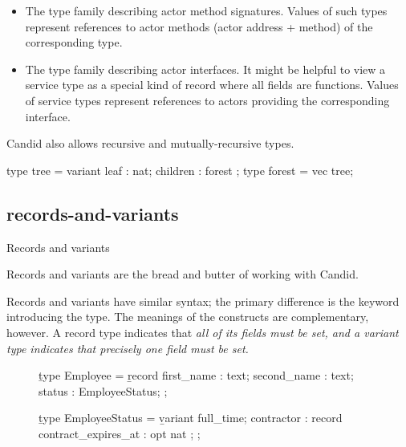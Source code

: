 \documentclass{article}
\begin{document}
\begin{itemize}
    \item
    The \href{https://internetcomputer.org/docs/current/references/candid-ref#type-func---}{} type family describing actor method signatures.
    Values of such types represent references to actor methods (actor address + method) of the corresponding type.
    \item
    The \href{https://internetcomputer.org/docs/current/references/candid-ref#type-service-}{} type family describing actor interfaces.
    It might be helpful to view a service type as a special kind of record where all fields are functions.
    Values of service types represent references to actors providing the corresponding interface.
\end{itemize}

Candid also allows recursive and mutually-recursive types.

\begin{code}[good]
type tree = variant { leaf : nat; children : forest };
type forest = vec tree;
\end{code}

\subsection{records-and-variants}{Records and variants}

Records and variants are the bread and butter of working with Candid.

Records and variants have similar syntax; the primary difference is the keyword introducing the type.
The meanings of the constructs are complementary, however.
A record type indicates that \em{all} of its fields must be set, and a variant type indicates that precisely \em{one} field must be set.

\begin{figure}

\begin{code}[candid]
\b{type} Employee = \b{record} {
  first_name : text;
  second_name : text;
  status : EmployeeStatus;
};

\b{type} EmployeeStatus = \b{variant} {
  full_time;
  contractor : record { contract_expires_at : opt nat };
};
\end{code}
\end{figure}
\end{document}
